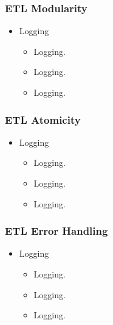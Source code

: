 \begin{frame}
\frametitle{ETL Modularity}
\begin{itemize}[<+->]
	\item Logging
	\begin{itemize}[<+->]
		\item  Logging.
		\item  Logging.
		\item  Logging.
		
		
	\end{itemize}
\end{itemize}
\end{frame}


\begin{frame}
\frametitle{ETL Atomicity}
\begin{itemize}[<+->]
	\item Logging
	\begin{itemize}[<+->]
		\item  Logging.
		\item  Logging.
		\item  Logging.
		
		
	\end{itemize}
\end{itemize}
\end{frame}


\begin{frame}
\frametitle{ETL Error Handling}
\begin{itemize}[<+->]
	\item Logging
	\begin{itemize}[<+->]
		\item  Logging.
		\item  Logging.
		\item  Logging.
		
		
	\end{itemize}
\end{itemize}
\end{frame}


